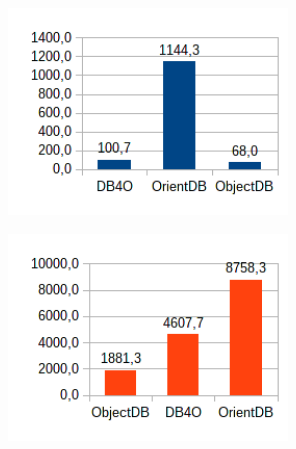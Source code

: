 \begin{figure}[!h]
\begin{subfigure}[b]{0.5\textwidth}
\end{subfigure}
\begin{subfigure}[b]{0.5\textwidth}
\includegraphics[width=20em]{obr/bench/oodbms13}
\end{subfigure}
\begin{subfigure}[b]{0.5\textwidth}
\includegraphics[width=20em]{obr/bench/oodbms14}
\end{subfigure}
\end{figure}


